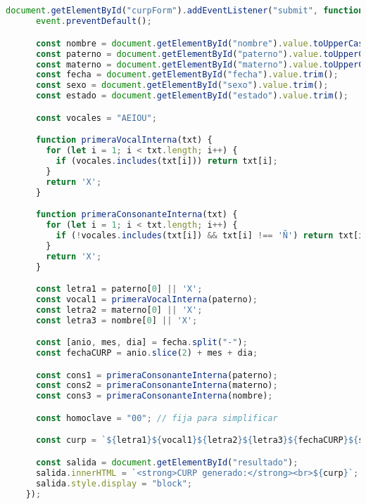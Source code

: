 \documentclass[10pt,a4paper]{article}
\begin{document}
\subsection{\color{colorESCOM}{Código JavaScript}}
\begin{lstlisting}[language=JavaScript]
document.getElementById("curpForm").addEventListener("submit", function(event) {
      event.preventDefault();

      const nombre = document.getElementById("nombre").value.toUpperCase().trim();
      const paterno = document.getElementById("paterno").value.toUpperCase().trim();
      const materno = document.getElementById("materno").value.toUpperCase().trim();
      const fecha = document.getElementById("fecha").value.trim();
      const sexo = document.getElementById("sexo").value.trim();
      const estado = document.getElementById("estado").value.trim();

      const vocales = "AEIOU";

      function primeraVocalInterna(txt) {
        for (let i = 1; i < txt.length; i++) {
          if (vocales.includes(txt[i])) return txt[i];
        }
        return 'X';
      }

      function primeraConsonanteInterna(txt) {
        for (let i = 1; i < txt.length; i++) {
          if (!vocales.includes(txt[i]) && txt[i] !== 'Ñ') return txt[i];
        }
        return 'X';
      }

      const letra1 = paterno[0] || 'X';
      const vocal1 = primeraVocalInterna(paterno);
      const letra2 = materno[0] || 'X';
      const letra3 = nombre[0] || 'X';

      const [anio, mes, dia] = fecha.split("-");
      const fechaCURP = anio.slice(2) + mes + dia;

      const cons1 = primeraConsonanteInterna(paterno);
      const cons2 = primeraConsonanteInterna(materno);
      const cons3 = primeraConsonanteInterna(nombre);

      const homoclave = "00"; // fija para simplificar

      const curp = `${letra1}${vocal1}${letra2}${letra3}${fechaCURP}${sexo}${estado}${cons1}${cons2}${cons3}${homoclave}`;

      const salida = document.getElementById("resultado");
      salida.innerHTML = `<strong>CURP generado:</strong><br>${curp}`;
      salida.style.display = "block";
    });
\end{lstlisting}

\pagebreak
\end{document}

